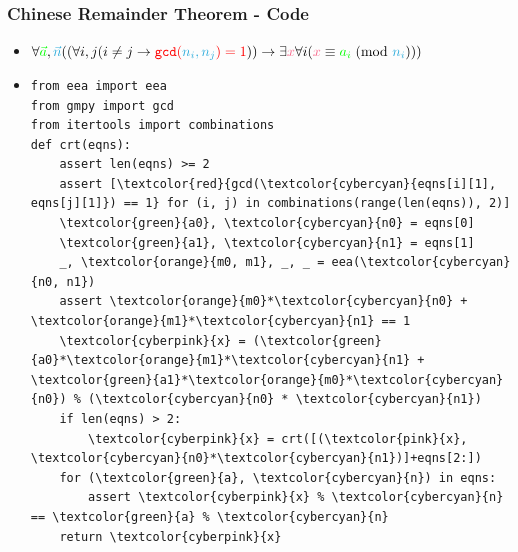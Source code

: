 \documentclass[aspectratio=169]{beamer}
\begin{document}
\begin{frame}[fragile]
\frametitle{Chinese Remainder Theorem - Code}
\begin{itemize}
\item $\forall {\color{green}\vec{a}}, {\color{cybercyan}\vec{n}}((\forall i,j(i \neq j \rightarrow {\color{red}\verb|gcd|({\color{cybercyan}n_i, n_j}) = 1})) \rightarrow \exists {\color{cyberpink}x} \forall i({\color{cyberpink}x} \equiv {\color{green}a_i}\hspace{1mm}(\text{mod }{\color{cybercyan}n_i})))$
\item
\begin{Verbatim}[fontsize=\scriptsize,commandchars=\\\{\}]
from eea import eea
from gmpy import gcd
from itertools import combinations
def crt(eqns):
    assert len(eqns) >= 2
    assert [\textcolor{red}{gcd(\textcolor{cybercyan}{eqns[i][1], eqns[j][1]}) == 1} for (i, j) in combinations(range(len(eqns)), 2)]
    \textcolor{green}{a0}, \textcolor{cybercyan}{n0} = eqns[0]
    \textcolor{green}{a1}, \textcolor{cybercyan}{n1} = eqns[1]
    _, \textcolor{orange}{m0, m1}, _, _ = eea(\textcolor{cybercyan}{n0, n1})
    assert \textcolor{orange}{m0}*\textcolor{cybercyan}{n0} + \textcolor{orange}{m1}*\textcolor{cybercyan}{n1} == 1
    \textcolor{cyberpink}{x} = (\textcolor{green}{a0}*\textcolor{orange}{m1}*\textcolor{cybercyan}{n1} + \textcolor{green}{a1}*\textcolor{orange}{m0}*\textcolor{cybercyan}{n0}) % (\textcolor{cybercyan}{n0} * \textcolor{cybercyan}{n1})
    if len(eqns) > 2:
        \textcolor{cyberpink}{x} = crt([(\textcolor{pink}{x}, \textcolor{cybercyan}{n0}*\textcolor{cybercyan}{n1})]+eqns[2:])
    for (\textcolor{green}{a}, \textcolor{cybercyan}{n}) in eqns:
        assert \textcolor{cyberpink}{x} % \textcolor{cybercyan}{n} == \textcolor{green}{a} % \textcolor{cybercyan}{n}
    return \textcolor{cyberpink}{x}
\end{Verbatim}
\end{itemize}
\end{frame}
\end{document}
